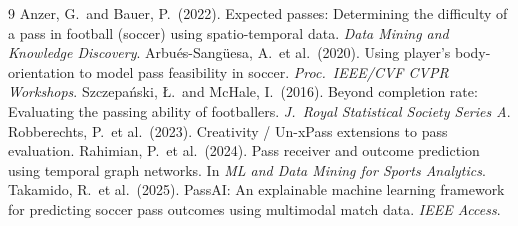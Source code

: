 \documentclass[11pt,a4paper]{article}
\begin{document}
\begin{thebibliography}{9}
 Anzer, G.\ and Bauer, P.\ (2022). Expected passes:
Determining the difficulty of a pass in football (soccer) using
spatio-temporal data. \textit{Data Mining and Knowledge Discovery}.
 Arbu\'es-Sang\"uesa, A.\ et al.\ (2020). Using
player's body-orientation to model pass feasibility in soccer.
\textit{Proc.\ IEEE/CVF CVPR Workshops}.
 Szczepa\'nski, \L.\ and McHale, I.\ (2016).
Beyond completion rate: Evaluating the passing ability of footballers.
\textit{J.\ Royal Statistical Society Series A}.
 Robberechts, P.\ et al.\ (2023). Creativity /
Un-xPass extensions to pass evaluation.
 Rahimian, P.\ et al.\ (2024). Pass receiver and
outcome prediction using temporal graph networks. In \textit{ML and Data
Mining for Sports Analytics}.
 Takamido, R.\ et al.\ (2025). PassAI: An
explainable machine learning framework for predicting soccer pass
outcomes using multimodal match data. \textit{IEEE Access}.
\end{thebibliography}
\end{document}
